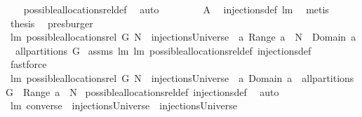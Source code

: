 \begin{isabellebody}
\ \ \isamarkupfalse%
\ possible{\isacharunderscore}allocations{\isacharunderscore}rel{\isacharunderscore}def\ \isamarkupfalse%
\ auto\ \isanewline
\ \ \isamarkupfalse%
\ \isamarkupfalse%
\ {\isachardoublequoteopen}{\isachardot}{\isachardot}{\isachardot}\ {\isacharequal}\ {\isacharquery}A{\isachardoublequoteclose}\ \isamarkupfalse%
\ injections{\isacharunderscore}def\ lm{}{}\ \isamarkupfalse%
\ metis\isanewline
\ \ \isamarkupfalse%
\ \isamarkupfalse%
\ {\isacharquery}thesis\ \isamarkupfalse%
\ presburger\isanewline
{}\isamarkupfalse%
%
\endisatagproof
{\isafoldproof}%
%
\isadelimproof
\isanewline
%
\endisadelimproof
\isanewline
{}\isamarkupfalse%
\ lm{}{}{\isacharcolon}\ {\isachardoublequoteopen}possible{\isacharunderscore}allocations{\isacharunderscore}rel\ G\ N\ {\isasymsubseteq}\ injectionsUniverse\ {\isasyminter}\ {\isacharbraceleft}a{\isachardot}\ Range\ a\ {\isasymsubseteq}\ N\ {\isacharampersand}\ Domain\ a\ {\isasymin}\ all{\isacharunderscore}partitions\ G{\isacharbraceright}{\isachardoublequoteclose}\isanewline
%
\isadelimproof
%
\endisadelimproof
%
\isatagproof
{}\isamarkupfalse%
\ assms\ lm{}{}\ lm{}{}\ possible{\isacharunderscore}allocations{\isacharunderscore}rel{\isacharunderscore}def\ injections{\isacharunderscore}def\ \isamarkupfalse%
\ fastforce%
\endisatagproof
{\isafoldproof}%
%
\isadelimproof
\isanewline
%
\endisadelimproof
\isanewline
{}\isamarkupfalse%
\ lm{}{}{\isacharcolon}\ {\isachardoublequoteopen}possible{\isacharunderscore}allocations{\isacharunderscore}rel\ G\ N\ {\isasymsupseteq}\ injectionsUniverse\ {\isasyminter}\ {\isacharbraceleft}a{\isachardot}\ Domain\ a\ {\isasymin}\ all{\isacharunderscore}partitions\ G\ {\isacharampersand}\ Range\ a\ {\isasymsubseteq}\ N{\isacharbraceright}{\isachardoublequoteclose}\isanewline
%
\isadelimproof
%
\endisadelimproof
%
\isatagproof
{}\isamarkupfalse%
\ possible{\isacharunderscore}allocations{\isacharunderscore}rel{\isacharunderscore}def\ injections{\isacharunderscore}def\ \isamarkupfalse%
\ auto%
\endisatagproof
{\isafoldproof}%
%
\isadelimproof
\isanewline
%
\endisadelimproof
\isanewline
{}\isamarkupfalse%
\ lm{}{}{\isacharcolon}\ {\isachardoublequoteopen}converse\ {\isacharbackquote}\ injectionsUniverse\ {\isacharequal}\ injectionsUniverse{\isachardoublequoteclose}%

\end{isabellebody}
